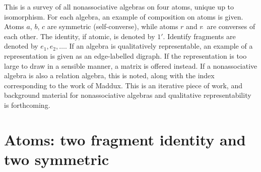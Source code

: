 \documentclass[12pt]{article}
\newcommand{\con}[1]{#1\breve{\ }}
\newcommand{\id}{{1'}}%
\begin{document}
This is a survey of all nonassociative algebras on four atoms, unique up to isomorphism. For each algebra, an example of composition on atoms is given. Atoms $a$, $b$, $c$ are symmetric (self-converse), while atoms $r$ and $\con{r}$ are converses of each other. The identity, if atomic, is denoted by $\id$. Identify fragments are denoted by $e_1, e_2, \dots$. If an algebra is qualitatively representable, an example of a representation is given as an edge-labelled digraph. If the representation is too large to draw in a sensible manner, a matrix is offered instead. If a nonassociative algebra is also a relation algebra, this is noted, along with the index corresponding to the work of Maddux. This is an iterative piece of work, and background material for nonassociative algebras and qualitative representability is forthcoming.

\section[Two fragment identity and two symmetric]{Atoms: two fragment identity and two symmetric}
\end{document}
